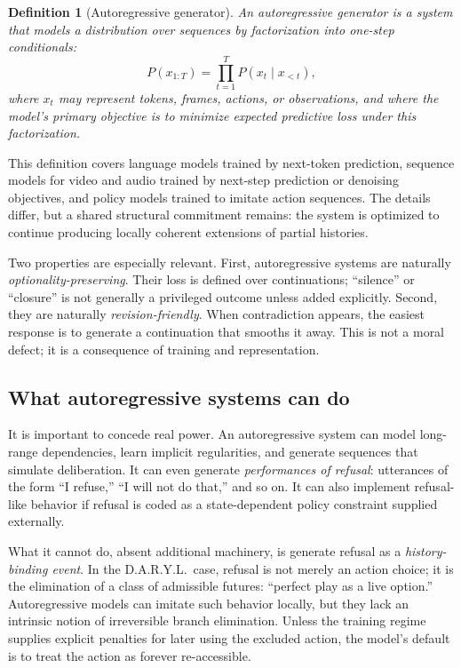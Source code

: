 \documentclass[11pt]{article}
\newtheorem{definition}{Definition}
\begin{document}
\begin{definition}[Autoregressive generator]
An autoregressive generator is a system that models a distribution over
sequences by factorization into one-step conditionals:
\[
P(x_{1:T}) = \prod_{t=1}^T P(x_t \mid x_{<t}),
\]
where $x_t$ may represent tokens, frames, actions, or observations, and where
the model's primary objective is to minimize expected predictive loss under this
factorization.
\end{definition}

This definition covers language models trained by next-token prediction,
sequence models for video and audio trained by next-step prediction or denoising
objectives, and policy models trained to imitate action sequences. The details
differ, but a shared structural commitment remains: the system is optimized to
continue producing locally coherent extensions of partial histories.

Two properties are especially relevant. First, autoregressive systems are
naturally \emph{optionality-preserving}. Their loss is defined over
continuations; ``silence'' or ``closure'' is not generally a privileged outcome
unless added explicitly. Second, they are naturally \emph{revision-friendly}.
When contradiction appears, the easiest response is to generate a continuation
that smooths it away. This is not a moral defect; it is a consequence of
training and representation.

\subsection{What autoregressive systems can do}

It is important to concede real power. An autoregressive system can model
long-range dependencies, learn implicit regularities, and generate sequences that
simulate deliberation. It can even generate \emph{performances of refusal}:
utterances of the form ``I refuse,'' ``I will not do that,'' and so on. It can
also implement refusal-like behavior if refusal is coded as a state-dependent
policy constraint supplied externally.

What it cannot do, absent additional machinery, is generate refusal as a
\emph{history-binding event}. In the D.A.R.Y.L.\ case, refusal is not merely
an action choice; it is the elimination of a class of admissible futures:
``perfect play as a live option.'' Autoregressive models can imitate such
behavior locally, but they lack an intrinsic notion of irreversible branch
elimination. Unless the training regime supplies explicit penalties for later
using the excluded action, the model's default is to treat the action as forever
re-accessible.
\end{document}
